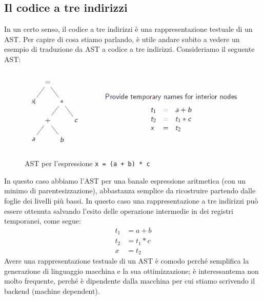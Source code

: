 \documentclass[class=book, crop=false, oneside, 12pt]{standalone}
\begin{document}
\subsection{Il codice a tre indirizzi}
In un certo senso, il codice a tre indirizzi è una rappresentazione testuale di un AST. Per capire di cosa stiamo parlando, è utile andare subito a vedere un esempio di traduzione da AST a codice a tre indirizzi. Consideriamo il seguente AST:
\begin{figure}[H]
    \centering
    \includegraphics[width=.5\textwidth]{ex1.png}
    \caption{AST per l'espressione \texttt{x = (a + b) * c}}
    \label{fig:ast-to-tac-ex1}
\end{figure}
In questo caso abbiamo l'AST per una banale espressione aritmetica (con un minimo di parentesizzazione), abbastanza semplice da ricostruire partendo dalle foglie dei livelli più bassi. In questo caso una rappresentazione a tre indirizzi può essere ottenuta salvando l'esito delle operazione intermedie in dei registri temporanei, come segue:
\begin{align*}
    t_1 &= a + b \\
    t_2 &= t_1 * c \\
    x &= t_2
\end{align*}
Avere una rappresentazione testuale di un AST è comodo perché semplifica la generazione di linguaggio macchina e la sua ottimizzazione; è interessantema non molto frequente, perché è dipendente dalla macchina per cui stiamo scrivendo il backend (machine dependent).
\end{document}
